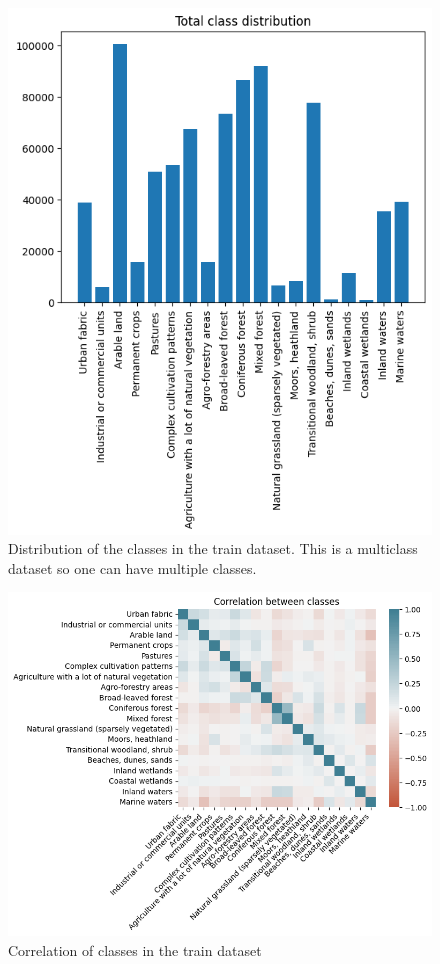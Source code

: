 \begin{figure}
  \centering
  \includegraphics[width=\linewidth]{images/class_distribution.png}
  \caption{Distribution of the classes in the train dataset. This is a multiclass dataset so one can have multiple classes.}
  \label{fig:class-distribution}
\end{figure}

\begin{figure}
  \centering
  \includegraphics[width=\linewidth]{images/correlation.png}
  \caption{Correlation of classes in the train dataset}
  \label{fig:correlation}
\end{figure}

